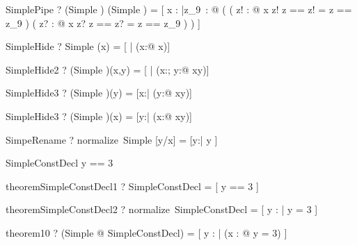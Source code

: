 \begin{theorem}{SimplePipe}
  \vdash? (Simple \land [z!:\nat]) \pipe (Simple \land [z?:\nat]) =
	  [ x : \arithmos
		|\exists z_{9}~: \arithmos @
		   ( ( \exists z! : \arithmos @
			         x \in \nat \land z! \in \nat \land \lblot z == z! \rblot = \lblot z == z_{9} \rblot )
				 \land
				 ( \exists z? : \arithmos @
				       x \in \nat \land z? \in \nat \land \lblot z == z? \rblot = \lblot z == z_{9} \rblot ) ) ]
\end{theorem}

\begin{theorem}{SimpleHide}
  \vdash? Simple \hide (x) = [ | (\exists x:\arithmos @ x\in\nat)]
\end{theorem}

\begin{theorem}{SimpleHide2}
  \vdash? (Simple )\hide(x,y) =
                [ | (\exists x:\arithmos; y:\arithmos @ x\in\nat \land y\in\nat)]
\end{theorem}

\begin{theorem}{SimpleHide3}
  \vdash? (Simple )\hide(y) =
          [x:\arithmos | (\exists y:\arithmos @ x\in\nat \land y\in\nat)]
\end{theorem}

\begin{theorem}{SimpleHide3}
  \vdash? (Simple )\hide(x) =
          [y:\arithmos | (\exists x:\arithmos @ x\in\nat \land y\in\nat)]
\end{theorem}

\begin{theorem}{SimpeRename}
  \vdash? normalize~Simple [y/x] = [y:\arithmos | y \in \nat]
\end{theorem}

\begin{schema}{SimpleConstDecl}
  y == 3
\end{schema}

\begin{theorem}{theoremSimpleConstDecl1}
  \vdash? SimpleConstDecl =
    [ y == 3 ]
\end{theorem}

\begin{theorem}{theoremSimpleConstDecl2}
  \vdash? normalize~SimpleConstDecl =
    [ y : \arithmos | y = 3 ]
\end{theorem}

\begin{theorem}{theorem10}
  \vdash? (\exists Simple @ SimpleConstDecl) =
    [ y : \arithmos | 
      (\exists x : \nat @ y = 3) ]
\end{theorem}


